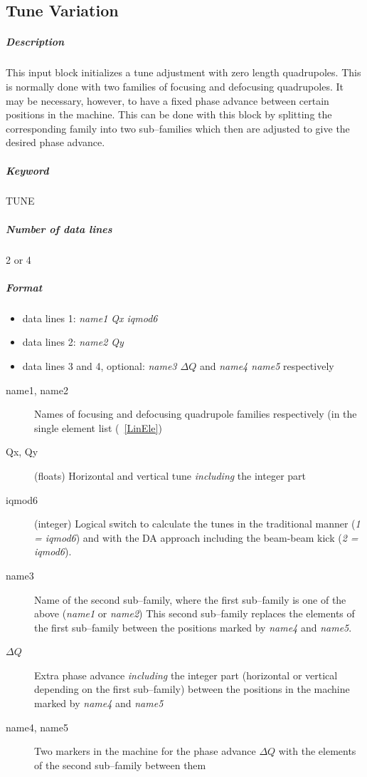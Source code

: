 \subsection{Tune Variation} \label{TunVar}

\subparagraph{Description} This input block initializes a tune
adjustment with zero length quadrupoles.  This is normally done with
two families of focusing and defocusing quadrupoles. It may be
necessary, however, to have a fixed phase advance between certain
positions in the machine. This can be done with this block by
splitting the corresponding family into two sub--families which then
are adjusted to give the desired phase advance.

\subparagraph{Keyword} TUNE \subparagraph{Number of data lines} 2 or 4

\subparagraph{Format}
\begin{itemize}
\item data lines 1: {\em name1 Qx iqmod6}
\item data lines 2: {\em name2 Qy}
\item data lines 3 and 4, optional: {\em name3 $\Delta Q$} \/and {\em
    name4 name5} \/respectively
\end{itemize}

\begin{description}
\item [name1, name2] Names of focusing and defocusing quadrupole
  families respectively (in the single element list (~\ref{LinEle})
\item [Qx, Qy] (floats) Horizontal and vertical tune {\em including}
  \/the integer part
\item [iqmod6] (integer) Logical switch to calculate the tunes in the
  traditional manner ({\it 1 = iqmod6}) and with the DA approach
  including the beam-beam kick ({\it 2 = iqmod6}).
\item [name3] Name of the second sub--family, where the first
  sub--family is one of the above ({\em name1} \/or {\em name2}\/)
  This second sub--family replaces the elements of the first
  sub--family between the positions marked by {\em name4} \/and {\em
    name5}\/.
\item [$\Delta Q$] Extra phase advance {\em including} \/the integer
  part (horizontal or vertical depending on the first sub--family)
  between the positions in the machine marked by {\em name4} \/and
  {\em name5}
\item [name4, name5] Two markers in the machine for the phase advance
  $\Delta Q$ with the elements of the second sub--family between them
\end{description}

